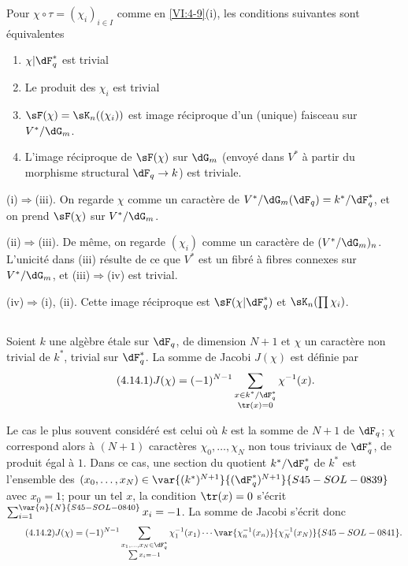 \begin{lemma_}\label{VI:4-13}
Pour $\chi\circ \tau=(\chi_i)_{i\in I}$ comme en \ref{VI:4-9}(i), les
conditions suivantes sont équivalentes 
\begin{enumerate}[\indent (i)]
  \item $\chi| \dF_q^\ast$ est trivial 
  \item Le produit des $\chi_i$ est trivial 
  \item $\sF(\chi) = \sK_n((\chi_i))$ est image réciproque d'un (unique) 
    faisceau sur $V^\ast/\dG_m$. 
  \item L'image réciproque de $\sF(\chi)$ sur $\dG_m$ (envoyé dans 
    $V^\ast$ à partir du morphisme structural $\dF_q \to k$) est triviale. 
\end{enumerate}
\end{lemma_}

(i)$\Rightarrow$(iii). On regarde $\chi$ comme un caractère de 
$V^\ast/\dG_m(\dF_q)=k^\ast/\dF_q^\ast$, et on prend $\sF(\chi)$ sur 
$V^\ast/\dG_m$. 

(ii)$\Rightarrow$(iii). De même, on regarde $(\chi_i)$ comme un caractère 
de $(V^\ast/\dG_m)_n$. L'unicité dans (iii) résulte de ce que $V^\ast$ est 
un fibré à fibres connexes sur $V^\ast/\dG_m$, et (iii)$\Rightarrow$(iv)  
est trivial. 

(iv)$\Rightarrow$(i), (ii). Cette image réciproque est 
$\sF(\chi|\dF_q^\ast)$ et $\sK_n(\prod \chi_i)$. 





\subsection{}\label{VI:4-14}

Soient $k$ une algèbre étale sur $\dF_q$, de 
dimension $N+1$ et $\chi$ un caractère non trivial de $k^\ast$, trivial sur 
$\dF_q^\ast$. La somme de Jacobi $J(\chi)$ est définie par 
\begin{equation*}\tag{4.14.1}\label{VI:eq:4-14-1}
  J(\chi) = (-1)^{N-1} \sum_{\substack{x\in k^\ast/\dF_q^\ast \\ \tr(x)=0}} \chi^{-1}(x) \text{.} 
\end{equation*}

Le cas le plus souvent considéré est celui où $k$ est la somme de $N+1$
 de $\dF_q$; $\chi$ correspond alors à $(N+1)$ caractères
$\chi_0,\ldots,\chi_N$ non tous triviaux de $\dF_q^\ast$, de produit égal à $1$.
Dans ce cas, une section du quotient $k^\ast/\dF_q^\ast$ de $k^\ast$
est l'ensemble des $(x_0,\ldots,x_N)\in\var{(k^\ast)^{N+1}}{(\dF_q^\ast)^{N+1}}{S45-SOL-0839}$ avec $x_0=1$;
pour un tel $x$, la condition $\tr(x)=0$ s'écrit $\sum_{i=1}^{\var{n}{N}{S45-SOL-0840}}x_i=-1$.
La somme de Jacobi s'écrit donc
\begin{equation*}\tag{4.14.2}\label{VI:eq:4-14-2}
 J(\chi)=(-1)^{N-1}\sum_{\substack{x_1,\ldots,x_N\in\dF_q^\ast\\\sum x_i=-1}}
 \chi_1^{-1}(x_1)\cdots\var{\chi_n^{-1}(x_n)}{\chi_N^{-1}(x_N)}{S45-SOL-0841} \text{.}
\end{equation*}


